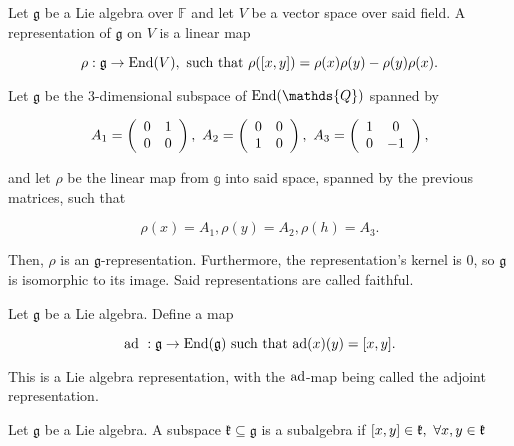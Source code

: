 \documentclass{homework}
\begin{document}
\begin{df}
Let $\mathfrak{g}$ be a Lie algebra over $\mathds{F}$ and let $V$ be a vector space over said field. A representation of $\mathfrak{g}$ on $V$ is a linear map

$$
   \rho: \mathfrak{g} \rightarrow \textnormal{End}(V), \textnormal{ such that } \rho([x,y]) = \rho(x)\rho(y) - \rho(y) \rho(x). 
$$
\end{df}

\begin{tcolorbox}[title = Example]
Let $\mathfrak{g}$ be the 3-dimensional subspace of $\textnormal{End}(\mathds{Q})$ spanned by 

$$
    {A}_1 = \left(\begin{array}{cc}
        0 & 1 \\
        0 & 0
    \end{array}\right), \textnormal{ } {A}_2 = \left(\begin{array}{cc}
        0 & 0 \\
        1 & 0
    \end{array}\right), \textnormal{ } {A}_3 = \left(\begin{array}{cc}
        1 & 0 \\
        0 & -1
    \end{array}\right),
$$

and let $\rho$ be the linear map from $\mathds{g}$ into said space, spanned by the previous matrices, such that 

$$
    \rho(x) = A_1, \rho(y) = A_2, \rho(h) = A_3.
$$

Then, $\rho$ is an $\mathfrak{g}$-representation. Furthermore, the representation's kernel is 0, so $\mathfrak{g}$ is isomorphic to its image. Said representations are called faithful. \\
\end{tcolorbox}

\begin{df}
Let $\mathfrak{g}$ be a Lie algebra. Define a map 

$$
    \textnormal{ad }: \mathfrak{g} \rightarrow \textnormal{End}(\mathfrak{g}) \textnormal{ such that } \textnormal{ad}(x)(y) = [x,y]. 
$$

This is a Lie algebra representation, with the $\textnormal{ad}$-map being called the adjoint representation.
\end{df}

\begin{df}
Let $\mathfrak{g}$ be a Lie algebra. A subspace $\mathfrak{k} \subseteq \mathfrak{g}$ is a subalgebra if $[x,y] \in \mathfrak{k}, \textnormal{ } \forall x,y \in \mathfrak{k}$
\end{df}
\end{document}
